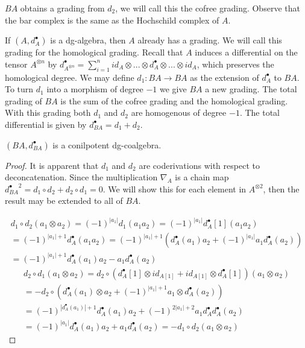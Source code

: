 \documentclass[../thesis.tex]{subfiles}
\begin{document}
            $BA$ obtains a grading from $d_2$, we will call this the cofree grading. Observe that the bar complex is the same as the Hochschild complex of $A$.

            If $(A, d_A^\bullet)$ is a dg-algebra, then $A$ already has a grading. We will call this grading for the homological grading. Recall that $A$ induces a differential on the tensor $A^{\otimes n}$ by $d_{A^{\otimes n}}^\bullet = \sum_{i=1}^n id_A\otimes ... \otimes d_A^\bullet \otimes ... \otimes id_A$, which preserves the homological degree. We may define $d_1 : BA \rightarrow BA$ as the extension of $d_A^\bullet$ to $BA$. To turn $d_1$ into a morphism of degree $-1$ we give $BA$ a new grading. The total grading of $BA$ is the sum of the cofree grading and the homological grading. With this grading both $d_1$ and $d_2$ are homogenous of degree $-1$. The total differential is given by $d_{BA}^\bullet = d_1 + d_2$.

            \begin{proposition}
                $(BA, d_{BA}^\bullet)$ is a conilpotent dg-coalgebra.
            \end{proposition}

            \begin{proof}
                It is apparent that $d_1$ and $d_2$ are coderivations with respect to deconcatenation. Since the multiplication $\nabla_A$ is a chain map ${d_{BA}^\bullet}^2 = d_1 \circ d_2 + d_2 \circ d_1= 0$. We will show this for each element in $A^{\otimes 2}$, then the result may be extended to all of $BA$.

                \begin{multline*}
                    d_1 \circ d_2 (a_1\otimes a_2) = (-1)^{|a_1|}d_1 (a_1a_2) = (-1)^{|a_1|}d_A^\bullet[1](a_1a_2) \\ = (-1)^{|a_1|+1}d_A^\bullet(a_1a_2) = (-1)^{|a_1|+1}(d_A^\bullet(a_1)a_2 + (-1)^{|a_1|}a_1d_A^\bullet(a_2)) \\ = (-1)^{|a_1|+1}d_A^\bullet(a_1)a_2 - a_1d_A^\bullet(a_2)
                \end{multline*}
                \begin{multline*}
                    d_2\circ d_1 (a_1\otimes a_2) = d_2\circ (d_A^\bullet[1]\otimes id_{A[1]} + id_{A[1]}\otimes d_A^\bullet[1]) (a_1\otimes a_2) \\ = -d_2 \circ (d_A^\bullet(a_1)\otimes a_2 + (-1)^{|a_1|+1}a_1\otimes d_A^\bullet(a_2)) \\ = (-1)^{|d_A^\bullet(a_1)|+1}d_A^\bullet(a_1)a_2 + (-1)^{2|a_1|+2}a_1d_A^\bullet d_A^\bullet(a_2) \\ = (-1)^{|a_1|}d_A^\bullet(a_1)a_2 + a_1d_A^\bullet (a_2) = -d_1\circ d_2 (a_1\otimes a_2)
                \end{multline*}
            \end{proof}
\end{document}
